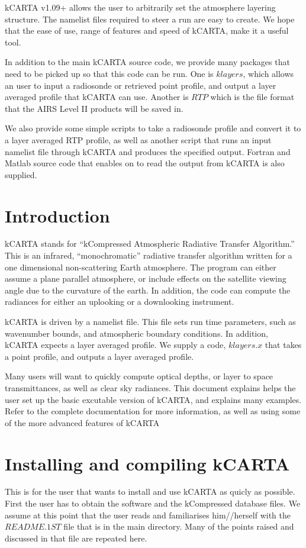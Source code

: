 \documentclass[11pt]{article}
\newcommand{\kc}{\textsf{kCARTA}\xspace}
\begin{document}
\kc v1.09+ allows the user to arbitrarily set the atmosphere layering 
structure. The namelist files required to steer a run are easy to create.  We 
hope that the ease of use, range of features and speed of \kc, make it a 
useful tool.

In addition to the main \kc source code, we provide many packages that need 
to be picked up so that this code can be run. One is $klayers$, which allows 
an user to input a radiosonde or retrieved point profile, and output a layer 
averaged profile that \kc can use. Another is $RTP$ which is the file format
that the AIRS Level II products will be saved in.

We also provide some simple scripts to take a radiosonde profile and convert 
it to a layer averaged RTP profile, as well as another script that runs an
input namelist file through \kc and produces the specified output. Fortran and
Matlab source code that enables on to read the output from \kc is also 
supplied.

\newpage
\section{Introduction}

\kc stands for ``kCompressed Atmospheric Radiative Transfer
Algorithm.''  This is an infrared, ``monochromatic'' radiative
transfer algorithm written for a one dimensional non-scattering Earth
atmosphere.  The program can either assume a plane parallel
atmosphere, or include effects on the satellite viewing angle due to
the curvature of the earth. In addition, the code can compute the radiances 
for either an uplooking or a downlooking instrument. 

\kc is driven by a namelist file. This file sets run time parameters, such as
wavenumber bounds, and atmospheric boundary conditions. In addition, \kc 
expects a layer averaged profile. We supply a code, $klayers.x$ that takes a 
point profile, and outputs a layer averaged profile.

Many users will want to quickly compute optical depths, or layer to space 
transmittances, as well as clear sky radiances. This document explains helps 
the user set up the basic excutable version of \kc, and explains many 
examples.  Refer to the complete documentation for more information, as well 
as using some of the more advanced features of \kc

\section{Installing and compiling \kc}
This is for the user that wants to install and use \kc as quicly as 
possible. First the user has to obtain the software and the kCompressed
database files. We assume at this point that the user reads and familiarises
him//herself with the $README.1ST$ file that is in the main directory. Many of
the points raised and discussed in that file are repeated here. 
\end{document}
